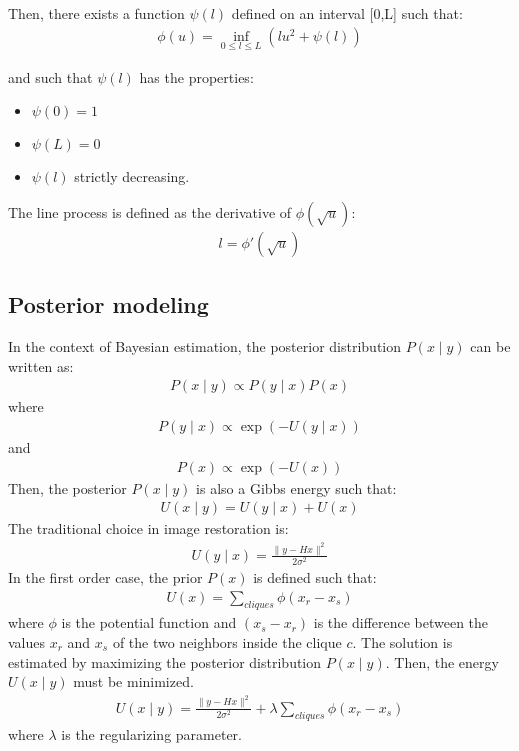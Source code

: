 \documentclass[11pt,a4paper]{article}
\begin{document}
Then, there exists a function $\psi(l)$ defined on an interval [0,L] 
such that: 
\begin{eqnarray} 
\phi(u) = \inf_{0\leq l\leq L}(lu^2+\psi(l))
\label{eqn_vdl}
\end{eqnarray}

and such that $\psi(l)$ has the properties:
\begin{itemize}
\item $\psi(0)=1$
\item $\psi(L)=0$ 
\item $\psi(l)$ strictly decreasing.
\end{itemize}

The line process is defined as the derivative of  
$\phi(\sqrt u)$:
\begin{eqnarray} 
l = \phi'(\sqrt u) 
\end{eqnarray}

\subsection{Posterior modeling}
 
In the context of Bayesian estimation, the posterior distribution  
$P({x \mid y})$ can be written as:
\begin{eqnarray}
P({x \mid y}) \propto P({y \mid x})P({x}) 
\end{eqnarray}
where 
\begin{eqnarray} 
P({y \mid x}) \propto \exp(-U({y \mid x})) 
\end{eqnarray}
and
\begin{eqnarray}
P({x}) \propto \exp(-U({x}))
\end{eqnarray}
Then, the posterior $P({x \mid y})$ is also a Gibbs energy such that:
\begin{eqnarray}
U({x \mid y}) = U({y \mid x}) + U({x})
\end{eqnarray}
The traditional choice in image restoration is:
\begin{eqnarray} 
U({y \mid x}) = \frac{\|{y-Hx}\|^2}{2\sigma^2}
\end{eqnarray}
In the first order case, the prior $P({x})$ is defined such that:
\begin{eqnarray} 
U({x}) = \sum_{cliques} \phi(x_r-x_s)
\end{eqnarray} 
where $\phi$ is the potential function and $(x_s-x_r)$ is the difference 
between the values $x_r$ and $x_s$ of the two neighbors inside the 
clique $c$.
The solution is estimated by maximizing the posterior distribution
$P({x \mid y})$.
Then, the energy $U({x \mid y})$ must be minimized.
\begin{eqnarray} 
U({x \mid y}) = \frac{\|{y-Hx}\|^2}{2\sigma^2}
               + \lambda \sum_{cliques} \phi(x_r-x_s) 
\label{eqn_cr}	       
\end{eqnarray}
where $\lambda$ is the regularizing parameter.
\end{document}
